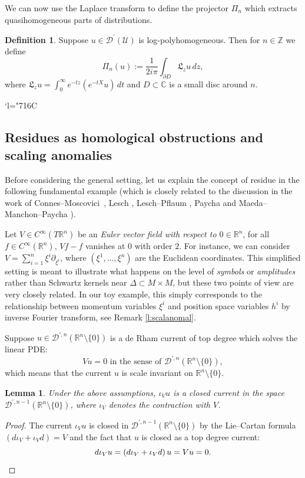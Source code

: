 \documentclass[10pt]{amsart}
\let\pazocal\mathscr
\newcommand{\Changelback}{\mathcode`l="716C}
\newtheorem{lemma}[theorem]{Lemma}
\theoremstyle{definition}
\newtheorem{definition}[theorem]{Definition}
\newcommand\rr{{\mathbb R}}
\newcommand\zz{{\mathbb Z}}
\newcommand\cD{{\pazocal D}}
\let\euler X
\let\Feuler V
\let\exd u
\newcommand*{\defeq}{:=}
\newcommand\Cf{C^\infty}
\begin{document}
We can now use the Laplace transform to define
the projector $\Pi_n$ which extracts quasihomogeneous parts of distributions.

\begin{definition} \label{def:pi}
Suppose $u\in \cD^\prime(\pazocal{U})$ is log-polyhomogeneous. Then for $n\in\zz$ we define
\[
\Pi_n(u)\defeq \frac{1}{2i\pi}\int_{\partial D} \mathfrak{L}_zu \,dz,
\]
where $ \mathfrak{L}_z u= \int_0^\infty e^{-tz}(e^{-t\euler}u) \,dt$ and $D\subset \mathbb{C}$ is a small disc around $n$.
\end{definition}
\Changelback

\subsection{Residues as homological obstructions and scaling anomalies}\label{ss:toy}

Before considering the general setting, let us explain the concept of residue in the following fundamental example (which is closely related to the discussion in the work of Connes--Moscovici~\cite[\S5]{Connes1995}, Lesch \cite{Lesch}, Lesch--Pflaum \cite{Lesch2000}, Paycha \cite{paycha2,paycha} and Maeda--Manchon--Paycha \cite{Maeda2005}).

Let $\Feuler\in {\Cf(T\rr^{n})}$ be an \emph{Euler vector field with respect to $0\in \rr^{n}$}, \ie for all $f\in\Cf(\rr^{n})$, $\Feuler f-f$ vanishes at $0$ with order $2$. For instance, we can consider $\Feuler=\sum_{i=1}^n \xi^i \partial_{\xi^i}$, where $(\xi^1,\dots,\xi^n)$ are the Euclidean coordinates. This simplified setting is meant to illustrate what happens on the level of \emph{symbols} or \emph{amplitudes} rather than Schwartz kernels near $\Delta\subset M\times M$, but these two points of view are very closely related. In our toy example, this simply corresponds to the relationship between momentum variables $\xi^{i}$ and position space variables $h^{i}$ by inverse Fourier transform, see Remark \ref{l:scalanomal}.

Suppose $\exd\in \pazocal{D}^{\prime,n}(\rr^n\setminus\{0\})$ is a de Rham current of top degree
which solves the linear PDE:
\begin{equation}\label{toextend}
\Feuler \exd=0 \text{ in the sense of } \pazocal{D}^{\prime,n}(\rr^n\setminus \{0\}),
\end{equation}
which
means that the current $\exd$ is scale invariant on $\rr^n\setminus \{0\}$.
\begin{lemma}
Under the above assumptions, $\iota_\Feuler \exd$ is a closed current in
the space $\pazocal{D}^{\prime,n-1}(\rr^n\setminus \{0\})$, where $\iota_\Feuler$ denotes the contraction with $\Feuler$.
\end{lemma}
\begin{proof}
The current $\iota_\Feuler \exd$ is closed in $\pazocal{D}^{\prime,n-1}(\rr^n\setminus \{0\}) $
by the
Lie--Cartan formula $\left(d\iota_\Feuler+\iota_\Feuler d \right)=\Feuler$ and the fact that $\exd$ is closed as a top degree current:
\[
d\iota_\Feuler {\exd}=\left(d\iota_\Feuler+\iota_\Feuler d \right)\exd=\Feuler \exd=0.\qedhere
\]
\end{proof}
\end{document}

